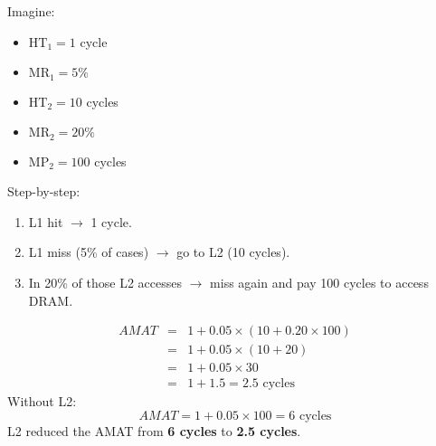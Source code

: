 \begin{examplebox}
    Imagine:
    \begin{itemize}
        \item $\text{HT}_{1} = 1$ cycle
        \item $\text{MR}_{1} = 5\%$
        \item $\text{HT}_{2} = 10$ cycles
        \item $\text{MR}_{2} = 20\%$
        \item $\text{MP}_{2} = 100$ cycles
    \end{itemize}
    Step-by-step:
    \begin{enumerate}
        \item L1 hit $\rightarrow$ 1 cycle.
        \item L1 miss (5\% of cases) $\rightarrow$ go to L2 (10 cycles).
        \item In 20\% of those L2 accesses $\rightarrow$ miss again and pay 100 cycles to access DRAM.
    \end{enumerate}
    \begin{equation*}
        \begin{array}{rcl}
            AMAT &=& 1 + 0.05 \times \left(10 + 0.20 \times 100\right) \\ [.3em]
            &=& 1 + 0.05 \times \left(10 + 20\right) \\ [.3em]
            &=& 1 + 0.05 \times 30 \\ [.3em]
            &=& 1 + 1.5 = 2.5 \text{ cycles}
        \end{array}
    \end{equation*}
    Without L2:
    \begin{equation*}
        AMAT = 1 + 0.05 \times 100 = 6 \text{ cycles}
    \end{equation*}
    L2 reduced the AMAT from \textbf{6 cycles} to \textbf{2.5 cycles}.
\end{examplebox}